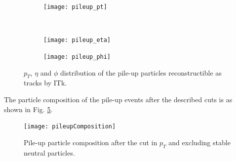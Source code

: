 \documentclass[a4paper,twoside,12pt]{article}
\begin{document}
\begin{figure}
\begin{subfigure}{\linewidth}
\texttt{[image: pileup\_pt]}
\caption{}
\label{fig:pileup_pt}
\end{subfigure}\\[1ex]
\begin{subfigure}{.5\linewidth}
\centering
\texttt{[image: pileup\_eta]}
\caption{}
\label{fig:pileup_eta}
\end{subfigure}
\begin{subfigure}{.5\linewidth}
\centering
\texttt{[image: pileup\_phi]}
\caption{}
\label{fig:pileup_phi}
\end{subfigure}
\caption{$p_{T}$, $\eta$ and $\phi$ distribution of the pile-up particles reconstructible as tracks by ITk.}
\label{fig:pileupDists}
\end{figure}

The particle composition of the pile-up events after the described cuts is as shown in Fig.
\ref{fig:pileupComposition}. 

\begin{figure} [h]
	\texttt{[image: pileupComposition]}
	\caption{Pile-up particle composition after the cut in $p_{T}$ and excluding stable neutral particles.}
	\label{fig:pileupComposition}
\end{figure}

\end{document}
